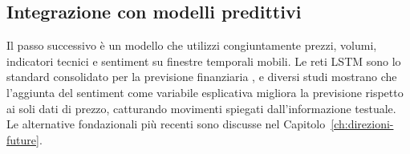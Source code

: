 \subsection{Integrazione con modelli predittivi}

Il passo successivo è un modello che utilizzi congiuntamente prezzi, volumi, indicatori tecnici e sentiment su finestre temporali mobili.
Le reti LSTM sono lo standard consolidato per la previsione finanziaria \parencite{fischer2018deep}, e diversi studi \parencite{ouf2024lstm, gu2024finbert} mostrano che l'aggiunta del sentiment come variabile esplicativa migliora la previsione rispetto ai soli dati di prezzo, catturando movimenti spiegati dall'informazione testuale.
Le alternative fondazionali più recenti sono discusse nel Capitolo~\ref{ch:direzioni-future}.
